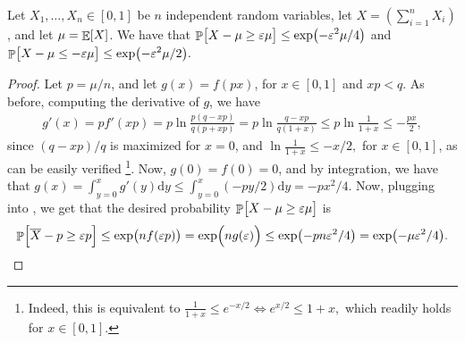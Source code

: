 \begin{theorem}
    Let $X_1, \ldots, X_n \in [0,1]$ be $n$ independent random
    variables, let $X= (\sum_{i=1}^n X_i)$, and let $\mu = \mathop{\mathbb{E}}\!\left[ {X} \right]$. We
    have that
    \begin{math}%
        \ds%
        \Prob{\bigl.{X} - \mu \geq \eps \mu }%
        \leq%
        \exp\pth{ -\eps^2 \mu / 4}
    \end{math}
    and
    \begin{math}%
        \ds%
        \Prob{\bigl. X - \mu \leq -\eps \mu }%
        \leq%
        \exp\pth{ - \eps^2 \mu/2}.
    \end{math}
\end{theorem}
\begin{proof}
    Let $p = \mu /n$, and let $g(x) = f(px)$, for $x \in [0,1]$ and
    $xp < q$. As before, computing the derivative of $g$, we have
    \begin{align*}
        g'(x)%
        =%
        p f'(xp)%
        =%
        p\ln \frac{p(q-xp)}{q(p+xp)} %
        =%
        p\ln \frac{q-xp}{q(1+x)} %
        \leq%
        p\ln \frac{1}{1+x}%
        \leq%
        - \frac{px}{2}, %
    \end{align*}
    since $(q-xp)/q$ is maximized for $x=0$, and
    \begin{math}
        \ln \frac{1}{1+x} \leq -x/2,
    \end{math}
    for $x \in [0,1]$, as can be easily verified%
    \footnote{Indeed, this is equivalent to
       \begin{math}
           \frac{1}{1+x} \leq e^{-x/2}%
           \iff%
           e^{x/2} \leq 1+x,
       \end{math}
       which readily holds for $x \in [0,1]$.%
    }. %
    Now, $g(0) =f (0) = 0$, and by integration, we have that
    \begin{math}
        g(x) =%
        \int_{y=0}^x g'(y) \mathrm{d} y %
        \leq%
        \int_{y=0}^x (-py/2) \mathrm{d} y %
        = -px^2/4.
    \end{math}
    Now, plugging into , we get
    that the desired probability
    \begin{math}
        \Prob{\bigl.{X} - \mu \geq \eps \mu }%
    \end{math}
    is %
    \begin{align*}%
        \ds%
        \Prob{\Bigl.\overline{X} - p \geq \eps p }%
        \leq%
        \exp\pth{ \bigl. nf(\eps p)} = \exp\pth{ \Bigl. n g(\eps)}
        \leq%
        \exp\pth{ \bigl. - p n\eps^2 /4}%
        =%
        \exp\pth{ \bigl. - \mu\eps^2 /4}.
    \end{align*}


\end{proof}
